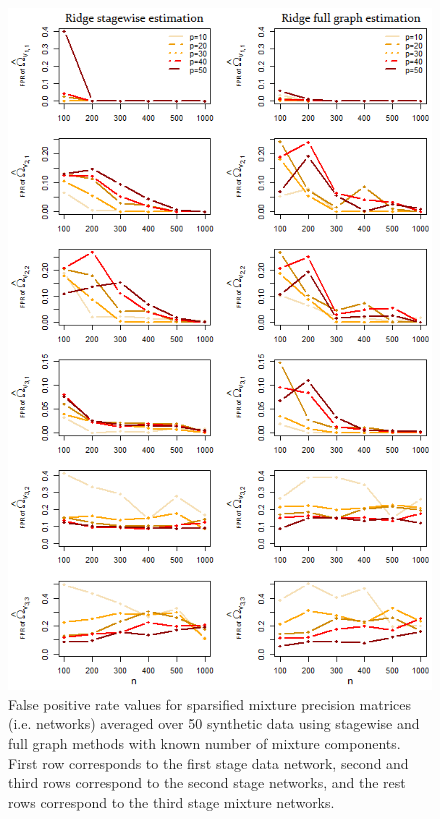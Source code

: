 \documentclass[10pt]{article}
\begin{document}
\begin{figure}
\begin{center}
 \includegraphics[scale=.6]{FPR.png}
\end{center}
\caption{False positive rate values for sparsified mixture precision matrices (i.e. networks) averaged over 50 synthetic data using stagewise and full graph methods with known number of mixture components. First row corresponds to the first stage data network, second and third rows correspond to the second stage networks, and the rest rows correspond to the third stage mixture networks.}
\label{fig:FPR}
\end{figure}
\end{document}
